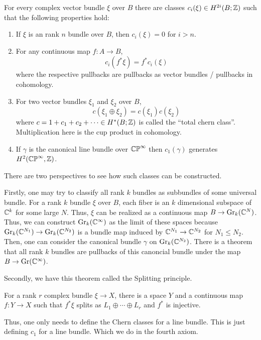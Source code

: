 \documentclass[12pt]{amsart}
\begin{document}
\begin{definition}
    For every complex vector bundle $\xi$ over $B$ there are classes $c_i(\xi) \in H^{2i}(B; \mathbb Z)$ such that the following properties hold: 
    \begin{enumerate}
        \item If $\xi$ is an rank $n$ bundle over $B$, then $c_i(\xi) = 0$ for $i > n$.
        \item For any continuous map $f: A \to B$, 
        \[ c_i(f^*\xi) = f^*c_i(\xi)\]
        where the respective pullbacks are pullbacks as vector bundles / pullbacks in cohomology.
        \item For two vector bundles $\xi_1$ and $\xi_2$ over $B$, 
        \[  c(\xi_1 \oplus \xi_2) = c(\xi_1)c(\xi_2)\]
        where $c = 1 + c_1 + c_2 + \cdots \in H^*(B; \mathbb Z)$ is called the ``total chern class''. Multiplication here is the cup product in cohomology. 
        \item If $\gamma$ is the canonical line bundle over $\mathbb{CP}^\infty$ then $c_1(\gamma)$ generates $H^2(\mathbb{CP}^\infty, \mathbb Z)$. 
    \end{enumerate}
\end{definition}

There are two perspectives to see how such classes can be constructed. 

Firstly, one may try to classify all rank $k$ bundles as subbundles of some universal bundle. For a rank $k$ bundle $\xi$ over $B$, each fiber is an $k$ dimensional subspace of $\mathbb C^k$ for some large $N$. Thus, $\xi$ can be realized as a continuous map $B \to \mathrm{Gr}_k(\mathbb C^N)$. Thus, we can construct $\mathrm{Gr}_k(\mathbb C^\infty)$ as the limit of these spaces because $\mathrm{Gr}_k(\mathbb C^{N_1}) \to \mathrm{Gr}_k(\mathbb C^{N_2})$ is a bundle map induced by $\mathbb C^{N_1} \to \mathbb C^{N_2}$ for $N_1 \leq N_2$. Then, one can consider the canonical bundle $\gamma$ on $\mathrm{Gr}_k(\mathbb C^{N_2})$. There is a theorem that all rank $k$ bundles are pullbacks of this canoncial bundle under the map $B \to \mathrm{Gr}(\mathbb C^\infty)$. 

Secondly, we have this theorem called the Splitting principle. 
\begin{theorem}
    For a rank $r$ complex bundle $\xi \to X$, there is a space $Y$ and a continuous map $f: Y \to X$ such that $f^* \xi$ splits as $L_1 \oplus \cdots \oplus L_r$ and $f^*$ is injective.  
\end{theorem}
Thus, one only needs to define the Chern classes for a line bundle. This is just defining $c_1$ for a line bundle. Which we do in the fourth axiom. 
\end{document}
